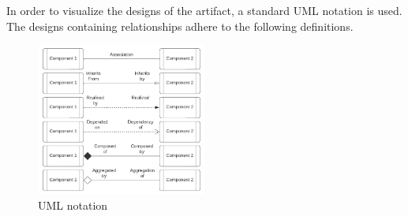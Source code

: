In order to visualize the designs of the artifact, a standard UML notation is used. The
designs containing relationships adhere to the following definitions.

\begin{figure}[H]
  \centering
  \includegraphics[width=0.5\textwidth]{figures/legenda.pdf}
  \caption[UML Notation used]{UML notation}
  \label{fi:class_diagram_relationship_notation}
\end{figure}
